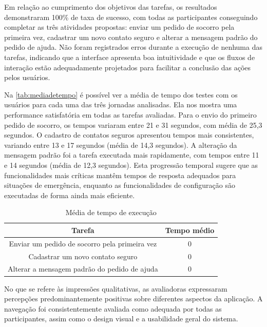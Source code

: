 Em relação ao cumprimento dos objetivos das tarefas, os resultados demonstraram 100\% de taxa de sucesso, com todas as participantes conseguindo completar as três atividades propostas: enviar um pedido de socorro pela primeira vez, cadastrar um novo contato seguro e alterar a mensagem padrão do pedido de ajuda. Não foram registrados erros durante a execução de nenhuma das tarefas, indicando que a interface apresenta boa intuitividade e que os fluxos de interação estão adequadamente projetados para facilitar a conclusão das ações pelos usuários.

Na \autoref{tab:mediadetempo} é possível ver a média de tempo dos testes com os usuários para cada uma das três jornadas analisadas. Ela nos mostra uma performance satisfatória em todas as tarefas avaliadas. Para o envio do primeiro pedido de socorro, os tempos variaram entre 21 e 31 segundos, com média de 25,3 segundos. O cadastro de contatos seguros apresentou tempos mais consistentes, variando entre 13 e 17 segundos (média de 14,3 segundos). A alteração da mensagem padrão foi a tarefa executada mais rapidamente, com tempos entre 11 e 14 segundos (média de 12,3 segundos). Esta progressão temporal sugere que as funcionalidades mais críticas mantêm tempos de resposta adequados para situações de emergência, enquanto as funcionalidades de configuração são executadas de forma ainda mais eficiente.

\begin{table}[htbp]
	\centering
	\caption[Média de tempo de execução]{Média de tempo de execução}
	\label{tab:mediadetempo}
	\begin{tabular}{cc}
		\hline
		\multicolumn{1}{|c|}{Tarefa}                                        & \multicolumn{1}{c|}{Tempo médio}            \\ \hline \hline
		\multicolumn{1}{|c|}{Enviar um pedido de socorro pela primeira vez} & \multicolumn{1}{c|}{0} \\ \hline
		\multicolumn{1}{|c|}{Cadastrar um novo contato seguro}              & \multicolumn{1}{c|}{0} \\ \hline
		\multicolumn{1}{|c|}{Alterar a mensagem padrão do pedido de ajuda}  & \multicolumn{1}{c|}{0} \\ \hline
	\end{tabular}
\end{table}


No que se refere às impressões qualitativas, as avaliadoras expressaram percepções predominantemente positivas sobre diferentes aspectos da aplicação. A navegação foi consistentemente avaliada como adequada por todas as participantes, assim como o design visual e a usabilidade geral do sistema.

